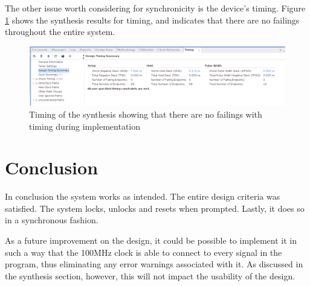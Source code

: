 \documentclass[12pt,a4paper]{article}
\begin{document}
The other issue worth considering for synchronicity is the device's timing. Figure \ref{fig:timing} shows the synthesis results for timing, and indicates that there are no failings throughout the entire system. 

\begin{figure}[H]
    \centering
    \includegraphics[scale=0.25]{images/synthesis_timing.png}
    \caption{Timing of the synthesis showing that there are no failings with timing during implementation}
    \label{fig:timing}
\end{figure}

\section{Conclusion}

In conclusion the system works as intended. The entire design criteria was satisfied. The system locks, unlocks and resets when prompted. Lastly, it does so in a synchronous fashion.

As a future improvement on the design, it could be possible to implement it in such a way that the 100MHz clock is able to connect to every signal in the program, thus eliminating any error warnings associated with it. As discussed in the synthesis section, however, this will not impact the usability of the design.
\end{document}
